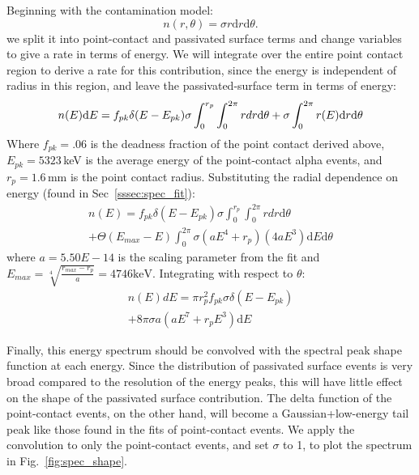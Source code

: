 \documentclass[groupedaddress,rmp,amsmath,amssymb,bibnotes,altaffilletter,twocolumn]{revtex4-1}
\begin{document}
Beginning with the contamination model:
$$n(r, \theta) = \sigma r \mathrm{d}r \mathrm{d}\theta. $$
we split it into point-contact and passivated surface terms and change variables to give a rate in terms of energy. We will integrate over the entire point contact region to derive a rate for this contribution, since the energy is independent of radius in this region, and leave the passivated-surface term in terms of energy:
$$n(E)\mathrm{d}E =  f_{pk}\delta(E-E_{pk})\sigma \int_{0}^{r_p} \int_{0}^{2\pi}r{d}r \mathrm{d}\theta \\
+ \sigma \int_{0}^{2\pi}r(E)\mathrm{d}r \mathrm{d}\theta 
$$
Where $f_{pk} = .06$ is the deadness fraction of the point contact derived above, $E_{pk}= 5323$\,keV is the average energy of the point-contact alpha events, and $r_p = 1.6$\,mm is the point contact radius. Substituting the radial dependence on energy (found in Sec~\ref{sssec:spec_fit}):
\begin{equation}
\begin{split}
n(E) = f_{pk}\delta(E-E_{pk})\sigma \int_{0}^{r_p} \int_{0}^{2\pi}r{d}r \mathrm{d}\theta \\
+  \Theta(E_{max}-E)\int_{0}^{2\pi}\sigma(aE^4 + r_p)(4aE^3)\mathrm{d}E \mathrm{d}\theta
\end{split}
\end{equation}
\vspace{1cm}
where $a = 5.50E-14$ is the scaling parameter from the fit and $E_{max} = \sqrt[4]{\frac{r_{max}-r_p}{a}} = 4746\mathrm{keV}$. 
Integrating with respect to $\theta$:
\begin{equation}
\begin{split}
n(E)dE = \pi r_p^2 f_{pk}\sigma\delta(E-E_{pk}) \\
+ 8\pi \sigma a (aE^7 + r_pE^3) \mathrm{d}E
\end{split}
\end{equation}

Finally, this energy spectrum should be convolved with the spectral peak shape function at each energy. Since the distribution of passivated surface events is very broad compared to the resolution of the energy peaks, this will have little effect on the shape of the passivated surface contribution. The delta function of the point-contact events, on the other hand, will become a Gaussian+low-energy tail peak like those found in the fits of point-contact events. We apply the convolution to only the point-contact events, and set $\sigma$ to 1, to plot the spectrum in Fig.~\ref{fig:spec_shape}.
 
\end{document}
